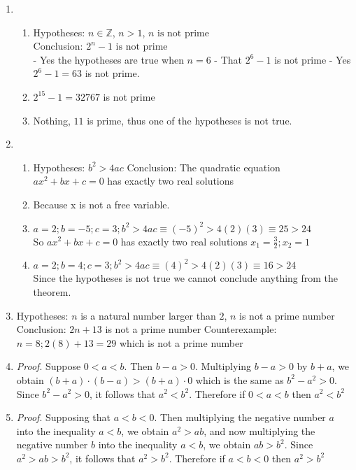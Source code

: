 \begin{enumerate}
\item
\begin{enumerate}
    \item 
    Hypotheses: $n \in \mathbb{Z}$, $n > 1$, $n \text{ is not prime}$\\
    Conclusion: $2^n - 1 \text{ is not prime}$ \\
    - Yes the hypotheses are true when $n=6$
    - That $2^6 - 1$ is not prime
    - Yes $2^6 - 1 = 63$ is not prime.
    \item 
    $2^15 - 1 = 32767$ is not prime
    \item
    Nothing, $11$ is prime, thus one of the hypotheses is not true.
\end{enumerate}
\item
\begin{enumerate}
    \item 
    Hypotheses: $b^2 > 4ac$
    Conclusion: The quadratic equation $ax^2 + bx +c = 0$ has exactly two real solutions
    \item 
    Because x is not a free variable.
    \item 
    $a=2; b=-5; c=3; b^2 > 4ac \equiv (-5)^{2}>4(2)(3) \equiv 25 > 24$\\
    So $ax^2 + bx +c = 0$ has exactly two real solutions $x_1 = \frac{3}{2}; x_2 = 1$
    \item 
    $a=2; b=4; c=3; b^2 > 4ac \equiv (4)^{2}>4(2)(3) \equiv 16 > 24$\\
    Since the hypotheses is not true we cannot conclude anything from the theorem.
\end{enumerate}
\item
Hypotheses: $n$ is a natural number larger than $2$, $n$ is not a prime number
Conclusion: $2n + 13$ is not a prime number
Counterexample: $n=8; 2(8)+13 = 29$ which is not a prime number
\item
\textit{Proof}. Suppose $0 < a < b$. Then $b - a > 0$.
Multiplying $b - a > 0$ by $b + a$, we obtain $(b+a) \cdot (b-a) > (b+a) \cdot 0$ which is the same as $b^2 - a^2 > 0$.
Since $b^2 - a^2 > 0$, it follows that $a^2 < b^2$. Therefore if $0 < a < b$ then $a^2 < b^2$
\item
\textit{Proof}. Supposing that $a<b<0$.
Then multiplying the negative number $a$ into the inequality $a<b$, we obtain $a^2 > ab$, and now multiplying the negative number $b$ into the inequality $a<b$, we obtain $ab > b^2$.
Since $a^2 > ab > b^2$, it follows that $a^2 > b^2$. Therefore if $a<b<0$ then $a^2 > b^2$

\end{enumerate}
